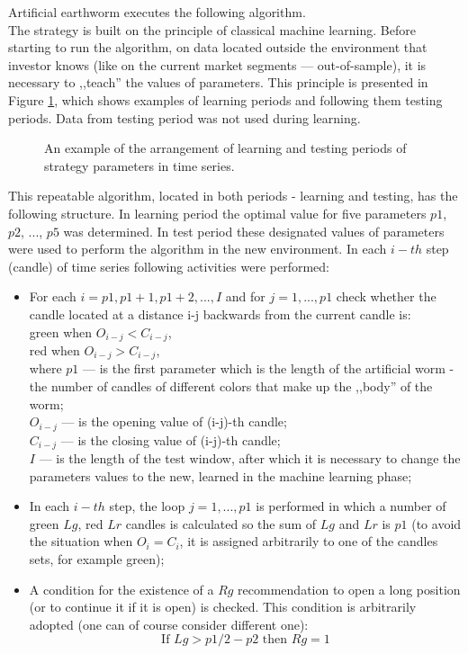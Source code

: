 \documentclass[runningheads,a4paper]{llncs}
\begin{document}
Artificial earthworm executes the following algorithm.\\
The strategy is built on the principle of classical machine learning. Before starting to run the algorithm, on data located outside the environment that investor knows (like on the current market segments --- out-of-sample), it is necessary to ,,teach''  the values of parameters. This principle is presented in Figure \ref{fig:fig2}, which shows examples of learning periods and following them testing periods. Data from testing period was not used during learning.\\
\begin{figure}[ht]
\centering
\caption{An example of the arrangement of learning and testing periods of strategy parameters in time series.}
\label{fig:fig2}
\end{figure}
\FloatBarrier
\vspace{-1em}
This repeatable algorithm, located in both periods - learning and testing, has the following structure. In learning period the optimal value for five parameters $p1$, $p2$, ..., $p5$ was determined. In test period these designated values of parameters were used to perform the algorithm in the new environment. In each $i-th$ step (candle) of time series following activities were performed:
\begin{itemize}
\item For each $i = p1, p1 +1, p1 +2, ..., I$ and for $j = 1, ..., p1$ check whether the candle located at a distance i-j backwards from the current candle is:\\
green when $O_{i-j} <C_{i-j}$, \\
red when $O_{i-j}> C_{i-j}$, \\
where $p1$ --- is the first parameter which is the length of the artificial worm - the number of candles of different colors that make up the ,,body'' of the worm; \\
$O_{i-j}$ --- is the opening value of (i-j)-th candle;\\ 
$C_{i-j}$ --- is the closing value of (i-j)-th candle; \\
$I$ --- is the length of the test window, after which it is necessary to change the parameters values to the new, learned in the machine learning phase;\\
\item In each $i-th$ step, the loop $j = 1, ..., p1$ is performed in which a number of green $Lg$, red $Lr$ candles is calculated so the sum of $Lg$ and $Lr$ is $p1$ (to avoid the situation when $O_i = C_i$, it is assigned arbitrarily to one of the candles sets, for example green);
\item A condition for the existence of a $Rg$ recommendation to open a long position (or to continue it if it is open) is checked. This condition is arbitrarily adopted (one can of course consider different one): 
\begin{equation}
\text{If } Lg> p1/2-p2 \text{ then } Rg=1
\end{equation}  
                                                     
\end{itemize}
\end{document}
